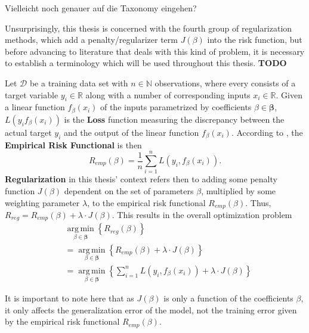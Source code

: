 \documentclass[12pt,a4paper]{article}
\newenvironment{lightbluebox}{%
    \begin{tcolorbox}[colback=lightblue, colframe=lightblue, fontupper=\itshape]%
}{%
    \end{tcolorbox}%
}
\DeclareMathOperator*{\argmin}{arg\,min}
\begin{document}
\begin{lightbluebox}
Vielleicht noch genauer auf die Taxonomy eingehen? 
\end{lightbluebox} 

Unsurprisingly, this thesis is concerned with the fourth group of regularization methods, which add a penalty/regularizer term $J(\beta)$ into the risk function, but before advancing to literature that deals with this kind of problem, it is necessary to establish a terminology which will be used throughout this thesis. \textbf{TODO}

Let $\mathcal{D}$ be a training data set with $n \in \mathbb{N}$ observations, where every  consists of a target variable $y_i \in \mathbb{R}$ along with a number of corresponding inputs $x_i \in \mathbb{R}$. Given a linear function $f_\beta(x_i)$ of the inputs parametrized by coefficients $\beta \in \boldsymbol{\beta}$, $L(y_i f_\beta(x_i))$ is the \textbf{Loss} function measuring the discrepancy between the actual target $y_i$ and the output of the linear function $f_\beta(x_i)$. According to \textcite{Vapnik1991}, the \textbf{Empirical Risk Functional} is then 
\[
R_{emp}(\beta) = \frac{1}{n} \sum_{i=1}^n L(y_i, f_\beta(x_i)).
\]
\textbf{Regularization} in this thesis' context refers then to adding some penalty function $J(\beta)$ dependent on the set of parameters $\beta$, multiplied by some weighting parameter $\lambda$, to the empirical risk functional $R_{emp}(\beta)$. Thus, $R_{reg} = R_{emp}(\beta) + \lambda\cdot J(\beta)$. This results in the overall optimization problem
\begin{align*}
&\underset{\beta \in \boldsymbol{\beta}}{\argmin}\left\{R_{reg}(\beta)\right\}\\
&=\underset{\beta \in \boldsymbol{\beta}}{\argmin}\left\{R_{emp}(\beta) + \lambda\cdot J(\beta)\right\}\\
&=\underset{\beta \in \boldsymbol{\beta}}{\argmin}\left\{\sum_{i=1}^n L(y_i, f_\beta(x_i)) + \lambda\cdot J(\beta)\right\}
\end{align*}

It is important to note here that as $J(\beta)$ is only a function of the coefficients $\beta$, it only affects the generalization error of the model, not the training error given by the empirical risk functional $R_{emp}(\beta)$.
\end{document}
